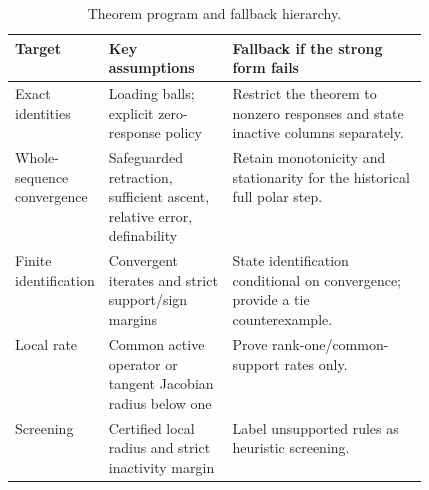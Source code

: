 \begin{table}[t]
\centering
\caption{Theorem program and fallback hierarchy.}
\label{tab:theorem-program}
\small
\begin{tabularx}{0.98\linewidth}{@{}p{0.18\linewidth}p{0.30\linewidth}X@{}}
\toprule
\textbf{Target} & \textbf{Key assumptions} & \textbf{Fallback if the strong form fails} \\
\midrule
Exact identities & Loading balls; explicit zero-response policy & Restrict the theorem to nonzero responses and state inactive columns separately. \\
Whole-sequence convergence & Safeguarded retraction, sufficient ascent, relative error, definability & Retain monotonicity and stationarity for the historical full polar step. \\
Finite identification & Convergent iterates and strict support/sign margins & State identification conditional on convergence; provide a tie counterexample. \\
Local rate & Common active operator or tangent Jacobian radius below one & Prove rank-one/common-support rates only. \\
Screening & Certified local radius and strict inactivity margin & Label unsupported rules as heuristic screening. \\
\bottomrule
\end{tabularx}
\end{table}
